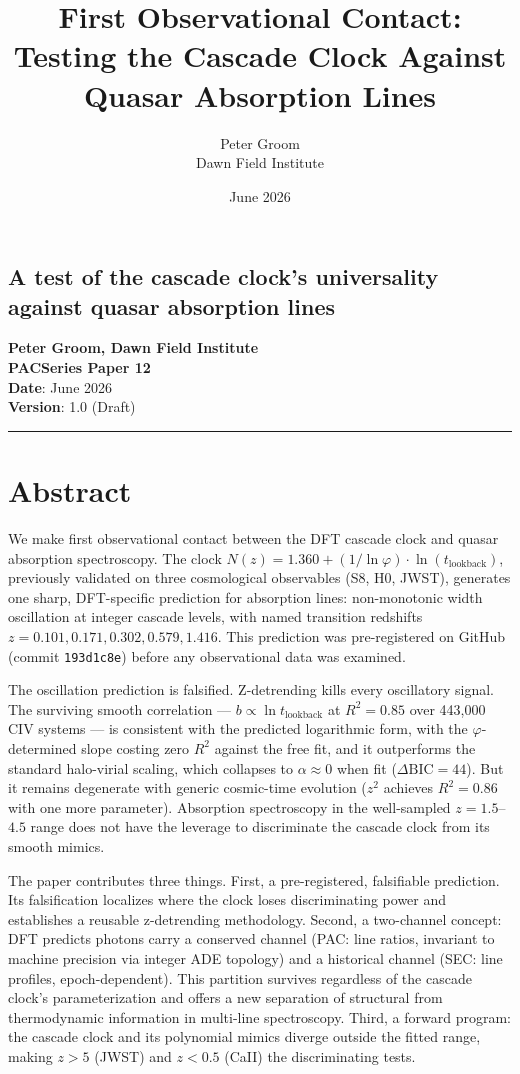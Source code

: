\documentclass[11pt,a4paper]{article}
\title{First Observational Contact: Testing the Cascade Clock Against Quasar Absorption Lines}
\author{Peter Groom \\ Dawn Field Institute}
\date{June 2026}
\begin{document}
\maketitle

\subsection*{A test of the cascade clock's universality against quasar absorption lines}

\textbf{Peter Groom, Dawn Field Institute} \\
\textbf{PACSeries Paper 12} \\
\textbf{Date}: June 2026 \\
\textbf{Version}: 1.0 (Draft)

\begin{center}\rule{0.5\linewidth}{0.4pt}\end{center}

\section*{Abstract}

We make first observational contact between the DFT cascade clock and quasar absorption spectroscopy. The clock $N(z) = 1.360 + (1/\ln\varphi) \cdot \ln(t_{\text{lookback}})$, previously validated on three cosmological observables (S8, H0, JWST), generates one sharp, DFT-specific prediction for absorption lines: non-monotonic width oscillation at integer cascade levels, with named transition redshifts $z = 0.101, 0.171, 0.302, 0.579, 1.416$. This prediction was pre-registered on GitHub (commit \texttt{193d1c8e}) before any observational data was examined.

The oscillation prediction is falsified. Z-detrending kills every oscillatory signal. The surviving smooth correlation — $b \propto \ln t_{\text{lookback}}$ at $R^2 = 0.85$ over 443,000 CIV systems — is consistent with the predicted logarithmic form, with the $\varphi$-determined slope costing zero $R^2$ against the free fit, and it outperforms the standard halo-virial scaling, which collapses to $\alpha \approx 0$ when fit ($\Delta\text{BIC} = 44$). But it remains degenerate with generic cosmic-time evolution ($z^2$ achieves $R^2 = 0.86$ with one more parameter). Absorption spectroscopy in the well-sampled $z = 1.5$–$4.5$ range does not have the leverage to discriminate the cascade clock from its smooth mimics.

The paper contributes three things. First, a pre-registered, falsifiable prediction. Its falsification localizes where the clock loses discriminating power and establishes a reusable z-detrending methodology. Second, a two-channel concept: DFT predicts photons carry a conserved channel (PAC: line ratios, invariant to machine precision via integer ADE topology) and a historical channel (SEC: line profiles, epoch-dependent). This partition survives regardless of the cascade clock's parameterization and offers a new separation of structural from thermodynamic information in multi-line spectroscopy. Third, a forward program: the cascade clock and its polynomial mimics diverge outside the fitted range, making $z > 5$ (JWST) and $z < 0.5$ (CaII) the discriminating tests.
\end{document}

